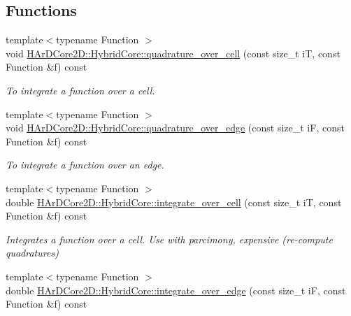 \subsection*{Functions}
\begin{DoxyCompactItemize}
\item 
\mbox{\label{group__HybridCore_ga3c33c8cec55dbe2d8873e53fcd43d01f}} 
{\footnotesize template$<$typename Function $>$ }\\void \hyperlink{group__HybridCore_ga3c33c8cec55dbe2d8873e53fcd43d01f}{H\+Ar\+D\+Core2\+D\+::\+Hybrid\+Core\+::quadrature\+\_\+over\+\_\+cell} (const size\+\_\+t iT, const Function \&f) const
\begin{DoxyCompactList}\small\item\em To integrate a function over a cell. \end{DoxyCompactList}\item 
\mbox{\label{group__HybridCore_gafbf9c61f2d929331197ba971b52b8710}} 
{\footnotesize template$<$typename Function $>$ }\\void \hyperlink{group__HybridCore_gafbf9c61f2d929331197ba971b52b8710}{H\+Ar\+D\+Core2\+D\+::\+Hybrid\+Core\+::quadrature\+\_\+over\+\_\+edge} (const size\+\_\+t iF, const Function \&f) const
\begin{DoxyCompactList}\small\item\em To integrate a function over an edge. \end{DoxyCompactList}\item 
\mbox{\label{group__HybridCore_ga64ffbc44306e06018efe3cea5a62f652}} 
{\footnotesize template$<$typename Function $>$ }\\double \hyperlink{group__HybridCore_ga64ffbc44306e06018efe3cea5a62f652}{H\+Ar\+D\+Core2\+D\+::\+Hybrid\+Core\+::integrate\+\_\+over\+\_\+cell} (const size\+\_\+t iT, const Function \&f) const
\begin{DoxyCompactList}\small\item\em Integrates a function over a cell. Use with parcimony, expensive (re-\/compute quadratures) \end{DoxyCompactList}\item 
\mbox{\label{group__HybridCore_ga03f276ea9c905d64662c39b7555d560c}} 
{\footnotesize template$<$typename Function $>$ }\\double \hyperlink{group__HybridCore_ga03f276ea9c905d64662c39b7555d560c}{H\+Ar\+D\+Core2\+D\+::\+Hybrid\+Core\+::integrate\+\_\+over\+\_\+edge} (const size\+\_\+t iF, const Function \&f) const

\end{DoxyCompactItemize}
